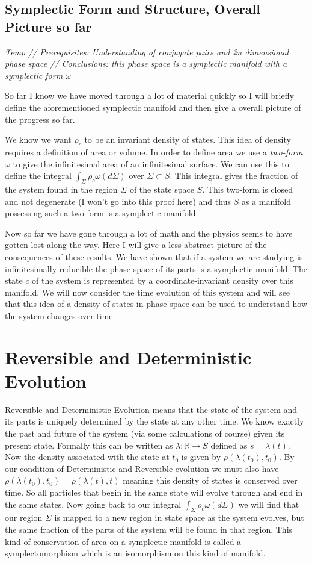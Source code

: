 \documentclass{article}
\begin{document}
\subsection{Symplectic Form and Structure, Overall Picture so far}
\textsl{Temp // Prerequisites: Understanding of conjugate pairs and 2n dimensional phase space // Conclusions: this phase space is a symplectic manifold with a symplectic form $\omega$}

	So far I know we have moved through a lot of material quickly so I will briefly define the aforementioned symplectic manifold and then give a overall picture of the progress so far. 
	
	We know we want $\rho_c$ to be an invariant density of states. This idea of density requires a definition of area or volume. In order to define area we use a \textit{two-form} $\omega$ to give the infinitesimal area of an infinitesimal surface. We can use this to define the integral $\int_{\Sigma} \rho_c\omega(d\Sigma)$ over $\Sigma \subset S$.	This integral gives the fraction of the system found in the region $\Sigma$ of the state space $S$. This two-form is closed and not degenerate (I won't go into this proof here) and thus $S$ as a manifold possessing such a two-form is a symplectic manifold.
	
	Now so far we have gone through a lot of math and the physics seems to have gotten lost along the way. Here I will give a less abstract picture of the consequences of these results. We have shown that if a system we are studying is infinitesimally reducible the phase space of its parts is a symplectic manifold. The state $c$ of the system is represented by a coordinate-invariant density over this manifold. We will now consider the time evolution of this system and will see that this idea of a density of states in phase space can be used to understand how the system changes over time.
	
\section{Reversible and Deterministic Evolution}

	Reversible and Deterministic Evolution means that the state of the system and its parts is uniquely determined by the state at any other time. We know exactly the past and future of the system (via some calculations of course) given its present state. Formally this can be written as $\lambda: \mathbb{R} \rightarrow S$ defined as $s = \lambda(t)$. Now the density associated with the state at $t_0$ is given by $\rho(\lambda(t_0),t_0)$. By our condition of Deterministic and Reversible evolution we must also have $\rho(\lambda(t_0),t_0) = \rho(\lambda(t),t)$ meaning this density of states is conserved over time. So all particles that begin in the same state will evolve through and end in the same states. Now going back to our integral $\int_{\Sigma} \rho_c\omega(d\Sigma)$ we will find that our region $\Sigma$ is mapped to a new region in state space as the system evolves, but the same fraction of the parts of the system will be found in that region. This kind of conservation of area on a symplectic manifold is called a symplectomorphism which is an isomorphism on this kind of manifold. 
	
\end{document}

